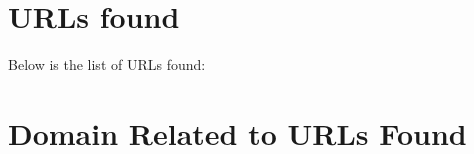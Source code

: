 \documentclass{article}
\begin{document}
\clearpage


\section{URLs found}

Below is the list of URLs found:

\clearpage

\section{Domain Related to URLs Found}
\end{document}
